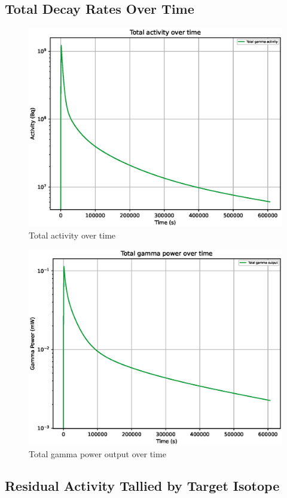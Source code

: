 \FloatBarrier
\clearpage

\subsection{Total Decay Rates Over Time}

\begin{figure}[htb]
\centering
\includegraphics[width=0.5\linewidth]{chapters/results_activity_code/mo-john-hewett/thick/totals/total_activity.eps}
\caption{Total activity over time}
\label{fig:mototalactivity}
\end{figure}

\begin{figure}[htb]
\centering
\includegraphics[width=0.5\linewidth]{chapters/results_activity_code/mo-john-hewett/thick/totals/total_gamma_power_mw.eps}
\caption{Total gamma power output over time}
\label{fig:mototalgammaoutput}
\end{figure}



\FloatBarrier
\clearpage

\subsection{Residual Activity Tallied by Target Isotope}

